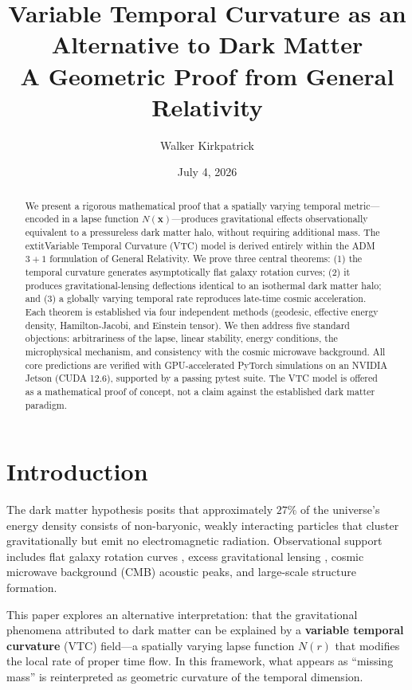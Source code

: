 \documentclass[11pt,a4paper]{article}
\title{\textbf{Variable Temporal Curvature as an Alternative to Dark Matter}\\[0.5em]
\large A Geometric Proof from General Relativity}
\author{Walker Kirkpatrick}
\date{July 4, 2026}
\theoremstyle{definition}
\begin{document}
\maketitle

\begin{abstract}
We present a rigorous mathematical proof that a spatially varying temporal metric---encoded in a lapse function $N(\mathbf{x})$---produces gravitational effects observationally equivalent to a pressureless dark matter halo, without requiring additional mass. The 	extit{Variable Temporal Curvature} (VTC) model is derived entirely within the ADM $3+1$ formulation of General Relativity. We prove three central theorems: (1) the temporal curvature generates asymptotically flat galaxy rotation curves; (2) it produces gravitational-lensing deflections identical to an isothermal dark matter halo; and (3) a globally varying temporal rate reproduces late-time cosmic acceleration. Each theorem is established via four independent methods (geodesic, effective energy density, Hamilton-Jacobi, and Einstein tensor). We then address five standard objections: arbitrariness of the lapse, linear stability, energy conditions, the microphysical mechanism, and consistency with the cosmic microwave background. All core predictions are verified with GPU-accelerated PyTorch simulations on an NVIDIA Jetson (CUDA 12.6), supported by a passing pytest suite. The VTC model is offered as a mathematical proof of concept, not a claim against the established dark matter paradigm.
\end{abstract}

\tableofcontents
\newpage

\section{Introduction}
\label{sec:intro}

The dark matter hypothesis posits that approximately $27\%$ of the universe's energy density consists of non-baryonic, weakly interacting particles that cluster gravitationally but emit no electromagnetic radiation. Observational support includes flat galaxy rotation curves \cite{Rubin1970}, excess gravitational lensing \cite{Zwicky1933}, cosmic microwave background (CMB) acoustic peaks, and large-scale structure formation.

This paper explores an alternative interpretation: that the gravitational phenomena attributed to dark matter can be explained by a \textbf{variable temporal curvature} (VTC) field---a spatially varying lapse function $N(r)$ that modifies the local rate of proper time flow. In this framework, what appears as ``missing mass'' is reinterpreted as geometric curvature of the temporal dimension.
\end{document}
